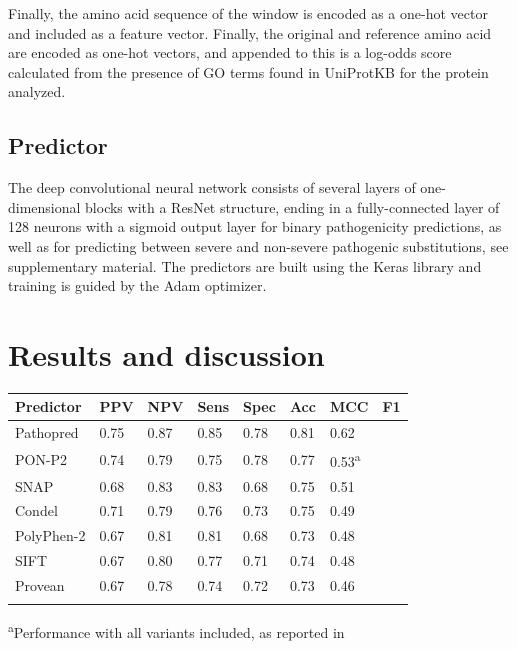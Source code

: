 \documentclass{bioinfo}
\begin{document}
\begin{methods}
Finally, the amino acid sequence of the window is encoded as a one-hot
vector and included as a feature vector. Finally, the original and
reference amino acid are encoded as one-hot vectors, and appended to
this is a log-odds score calculated from the presence of GO terms
found in UniProtKB for the protein analyzed.

\subsection{Predictor}

The deep convolutional neural network consists of several layers of
one-dimensional blocks with a ResNet structure, ending in a
fully-connected layer of 128 neurons with a sigmoid output layer for
binary pathogenicity predictions, as well as for predicting between severe 
and non-severe pathogenic substitutions, see supplementary material. 
The predictors are built using the Keras library \citep{Chollet2017} and training is
guided by the Adam optimizer.

\end{methods}

\section{Results and discussion}

\begin{table}[!t]
 {\begin{tabular}{@{}llllllll@{}}\toprule 
Predictor & PPV & NPV & Sens & Spec & Acc & MCC & F1\\\midrule
Pathopred & 0.75 & 0.87 & 0.85 & 0.78 & 0.81 & 0.62\\
PON-P2 & 0.74 & 0.79 & 0.75 & 0.78 & 0.77 & 0.53\textsuperscript{a}\\
SNAP & 0.68 & 0.83 & 0.83 & 0.68 & 0.75 & 0.51\\
Condel & 0.71 & 0.79 & 0.76 & 0.73 & 0.75 & 0.49\\
PolyPhen-2 & 0.67 & 0.81 & 0.81 & 0.68 & 0.73 & 0.48\\
SIFT & 0.67 & 0.80 & 0.77 & 0.71 & 0.74 & 0.48\\
Provean & 0.67 & 0.78 & 0.74 & 0.72 & 0.73 & 0.46\\\botrule
\end{tabular}}{\textsuperscript{a}Performance with all variants included, as reported in \citep{Niroula2015}}
\end{table}
\end{document}
